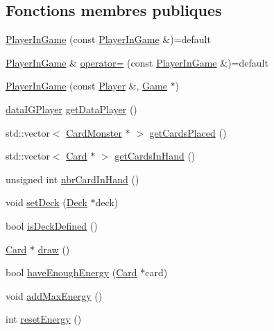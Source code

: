 \subsection*{Fonctions membres publiques}
\begin{DoxyCompactItemize}
\item 
\hyperlink{classPlayerInGame_a0015afc910afa4cc1cf4b28c689d78bc}{Player\+In\+Game} (const \hyperlink{classPlayerInGame}{Player\+In\+Game} \&)=default
\item 
\hyperlink{classPlayerInGame}{Player\+In\+Game} \& \hyperlink{classPlayerInGame_a9ce4261937a8d6e1587896166884c4ac}{operator=} (const \hyperlink{classPlayerInGame}{Player\+In\+Game} \&)=default
\item 
\hyperlink{classPlayerInGame_a5a34ac5ac93a64bb1208893d9bc0564d}{Player\+In\+Game} (const \hyperlink{classPlayer}{Player} \&, \hyperlink{classGame}{Game} $\ast$)
\item 
\hyperlink{structdataIGPlayer}{data\+I\+G\+Player} \hyperlink{classPlayerInGame_addeeee2e42cf2009fc21511624414146}{get\+Data\+Player} ()
\item 
std\+::vector$<$ \hyperlink{classCardMonster}{Card\+Monster} $\ast$ $>$ \hyperlink{classPlayerInGame_a519fc525decf5af1217b93749cd9ae99}{get\+Cards\+Placed} ()
\item 
std\+::vector$<$ \hyperlink{classCard}{Card} $\ast$ $>$ \hyperlink{classPlayerInGame_a9bed48a016fa37c67d4aa9e85e3daa9d}{get\+Cards\+In\+Hand} ()
\item 
unsigned int \hyperlink{classPlayerInGame_a9f8df0a2ef00955f318b41149f57fcb7}{nbr\+Card\+In\+Hand} ()
\item 
void \hyperlink{classPlayerInGame_a399370210526407c4234d19815a5fa44}{set\+Deck} (\hyperlink{classDeck}{Deck} $\ast$deck)
\item 
bool \hyperlink{classPlayerInGame_af4d06834c260aebb66c113f397ba3c86}{is\+Deck\+Defined} ()
\item 
\hyperlink{classCard}{Card} $\ast$ \hyperlink{classPlayerInGame_aef5bd608ed523be4eef3eda1c63a3f0a}{draw} ()
\item 
bool \hyperlink{classPlayerInGame_ac1629d9cadf7445be42eb3245daef6c4}{have\+Enough\+Energy} (\hyperlink{classCard}{Card} $\ast$card)
\item 
void \hyperlink{classPlayerInGame_aedc8c0d75e0d249fde42329dc0a59557}{add\+Max\+Energy} ()
\item 
int \hyperlink{classPlayerInGame_a72d83ef849db81abb4afac5a299f6c1f}{reset\+Energy} ()
\item 

\end{DoxyCompactItemize}
